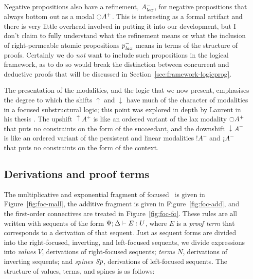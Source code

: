 Negative propositions also have a refinement, $A^-_{\it lax}$, for
negative propositions that always bottom out as a modal
${\ocircle}A^+$.  This is interesting as a formal artifact and there
is very little overhead involved in putting it into our development,
but I don't claim to fully understand what the refinement means or
what the inclusion of right-permeable atomic propositions $p^-_{\it lax}$
means in terms of the structure of proofs. Certainly we do {\it not}
want to include such propositions in the logical framework, as to do
so would break the distinction between concurrent and deductive proofs
that will be discussed in Section~\ref{sec:framework-logicprog}.

The presentation of the modalities, and the logic that we now present,
emphasises the degree to which the shifts ${\uparrow}$ and
${\downarrow}$ have much of the character of modalities in a focused
substructural logic; this point was explored in depth by Laurent in
his thesis \cite{laurent02etude}. The upshift ${\uparrow}A^+$ is like
an ordered variant of the lax modality ${\ocircle}A^+$ that puts no
constraints on the form of the succeedant, and the downshift
${\downarrow}A^-$ is like an ordered variant of the persistent and
linear modalities ${!}A^-$ and ${\gnab}A^-$ that puts no constraints
on the form of the context.

\subsection{Derivations and proof terms}
\label{sec:ord-proof-terms}





The multiplicative and exponential fragment of focused \ollll~is given
in Figure~\ref{fig:foc-mall}, the additive fragment is given in
Figure~\ref{fig:foc-add}, and the first-order connectives are treated
in Figure~\ref{fig:foc-fo}. These rules are all written with sequents
of the form ${\Psi}; {\Delta} \vdash {E} : {U}$, where $E$ is a {\it proof
  term} that corresponds to a derivation of that sequent. Just
as sequent forms are divided into the right-focused, inverting, and
left-focused sequents, we divide expressions into {\it values} $V$,
derivations of right-focused sequents; {\it terms} $N$,
derivations of inverting sequents; and {\it spines} ${\it Sp}$,
derivations of left-focused sequents. The structure of
values, terms, and spines is as follows:


